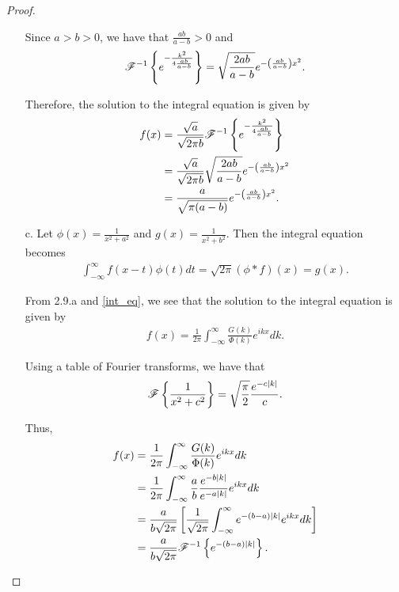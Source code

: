 \begin{proof}
\begin{enumerate}
      Since $a > b > 0$, we have that $\frac{ab}{a-b} > 0$ and
      \begin{align*}
        \mathscr{F}^{-1}\left\{ {e^{-\frac{k^2}{4\frac{ab}{a-b}}}} \right\} = \sqrt{\frac{2ab}{a-b}} e^{-\left(\frac{ab}{a-b}\right) x^2}.
      \end{align*}

      Therefore, the solution to the integral equation is given by
      \begin{align*}
        f(x) &= \frac{\sqrt{a}}{\sqrt{2\pi b}}\mathscr{F}^{-1}\left\{ {e^{-\frac{k^2}{4\frac{ab}{a-b}}}} \right\} \\
        &= \frac{\sqrt{a}}{\sqrt{2\pi b}} \sqrt{\frac{2ab}{a-b}} e^{-\left(\frac{ab}{a-b}\right) x^2} \\
        &= \frac{a}{\sqrt{\pi(a-b)}} e^{-\left(\frac{ab}{a-b}\right) x^2}.
      \end{align*}

    \item [c.] Let $\displaystyle \phi(x) = \frac{1}{x^2 + a^2}$ and $\displaystyle g(x) = \frac{1}{x^2 + b^2}$.
      Then the integral equation becomes
      \begin{align*}
        \int_{-\infty}^{\infty} f(x-t) \phi(t) dt = \sqrt{2\pi}(\phi \ast f)(x) = g(x).
      \end{align*}

      From 2.9.a and \eqref{int_eq}, we see that the solution to the integral equation is given by
      \begin{align*}
        f(x) = \frac{1}{2\pi} \int_{-\infty}^{\infty}\frac{G(k)}{\Phi(k)}e^{ikx} dk.
      \end{align*}

      Using a table of Fourier transforms, we have that
      \begin{align*}
        \mathscr{F}\left\{ {\frac{1}{x^2 + c^2}} \right\} = \sqrt{\frac{\pi}{2}} \frac{ e ^{-c |k|}}{c}.
      \end{align*}

      Thus,
      \begin{align*}
        f(x) &= \frac{1}{2\pi} \int_{-\infty}^{\infty} \frac{G(k)}{\Phi(k)}e^{ikx} dk \\
        &= \frac{1}{2\pi} \int_{-\infty}^{\infty} \frac{a}{b} \frac{e^{-b|k|}}{e^{-a|k|}}e^{ikx} dk \\
        &= \frac{a}{b\sqrt{2\pi}}\left[\frac{1}{\sqrt{2\pi}} \int_{-\infty}^{\infty}e^{-(b-a)|k|}e^{ikx}dk \right] \\
        &= \frac{a}{b\sqrt{2\pi}} \mathscr{F}^{-1}\left\{ {e^{-(b-a)|k|}} \right\}.
      \end{align*}


\end{enumerate}
\end{proof}
